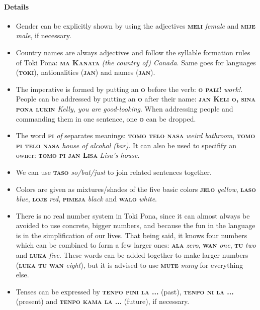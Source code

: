 \documentclass[10pt,a4paper]{article}
\begin{document}
\paragraph{Details}
\begin{multicols}{2}
\begin{itemize}
\item Gender can be explicitly shown by using the adjectives \textbf{\textsc{meli}} \textit{female} and \textbf{\textsc{mije}} \textit{male}, if necessary.
\item Country names are always adjectives and follow the syllable formation rules of Toki Pona: \textbf{\textsc{ma Kanata}} \textit{(the country of) Canada}. Same goes for languages (\textbf{\textsc{toki}}), nationalities (\textbf{\textsc{jan}}) and names (\textbf{\textsc{jan}}).
\item The imperative is formed by putting an \textbf{\textsc{o}} before the verb: \textbf{\textsc{o pali!}} \textit{work!}. People can be addressed by putting an \textbf{\textsc{o}} after their name: \textbf{\textsc{jan Keli o, sina pona lukin}} \textit{Kelly, you are good-looking}. When addressing people and commanding them in one sentence, one \textbf{\textsc{o}} can be dropped.
\item The word \textbf{\textsc{pi}} \textit{of} separates meanings: \textbf{\textsc{tomo telo nasa}} \textit{weird bathroom}, \textbf{\textsc{tomo pi telo nasa}} \textit{house of alcohol (bar)}. It can also be used to specifify an owner: \textbf{\textsc{tomo pi jan Lisa}} \textit{Lisa's house}.
\item We can use \textbf{\textsc{taso}} \textit{so/but/just} to join related sentences together.
\item Colors are given as mixtures/shades of the five basic colors \textbf{\textsc{jelo}} \textit{yellow}, \textbf{\textsc{laso}} \textit{blue}, \textbf{\textsc{loje}} \textit{red}, \textbf{\textsc{pimeja}} \textit{black} and \textbf{\textsc{walo}} \textit{white}.
\item There is no real number system in Toki Pona, since it can almost always be avoided to use concrete, bigger numbers, and because the fun in the language is in the simplification of our lives. That being said, it knows four numbers which can be combined to form a few larger ones: \textbf{\textsc{ala}} \textit{zero}, \textbf{\textsc{wan}} \textit{one}, \textbf{\textsc{tu}} \textit{two} and \textbf{\textsc{luka}} \textit{five}. These words can be added together to make larger numbers (\textbf{\textsc{luka tu wan}} \textit{eight}), but it is advised to use \textbf{\textsc{mute}} \textit{many} for everything else.
\item Tenses can be expressed by \textbf{\textsc{tenpo pini la ...}} (past), \textbf{\textsc{tenpo ni la ...}} (present) and \textbf{\textsc{tenpo kama la ...}} (future), if necessary.\\
\end{itemize}
\end{multicols}
\end{document}

